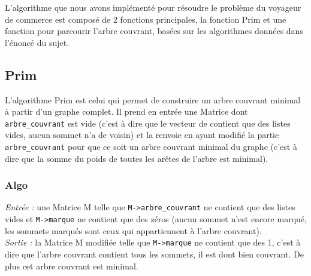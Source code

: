 \documentclass[a4paper,11pt]{article}
\begin{document}
L'algorithme que nous avons implémenté pour résoudre le problème du voyageur de commerce est composé de 2 fonctions principales, la fonction Prim et une fonction pour parcourir l'arbre couvrant, basées sur les algorithmes données dans l'énoncé du sujet.\\

\subsection{Prim} %

L'algorithme Prim est celui qui permet de construire un arbre couvrant minimal à partir d'un graphe complet. Il prend en entrée une Matrice dont \texttt{arbre\_couvrant} est vide (c'est à dire que le vecteur de contient que des listes vides, aucun sommet n'a de voisin) et la renvoie en ayant modifié la partie \texttt{arbre\_couvrant} pour que ce soit un arbre couvrant minimal du graphe (c'est à dire que la somme du poids de toutes les arêtes de l'arbre est minimal).\\

\subsubsection*{Algo}

\textit{Entrée :} une Matrice M telle que \texttt{M->arbre\_couvrant} ne contient que des listes vides et \texttt{M->marque} ne contient que des zéros (aucun sommet n'est encore marqué, les sommets marqués sont ceux qui appartiennent à l'arbre couvrant).\\
\textit{Sortie :} la Matrice M modifiée telle que \texttt{M->marque} ne contient que des 1, c'est à dire que l'arbre couvrant contient tous les sommets, il est dont bien couvrant. De plus cet arbre couvrant est minimal.\\
\end{document}
